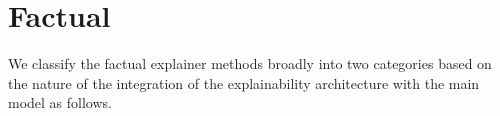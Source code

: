 \section{Factual}
\label{sec::Factual}
We classify the factual explainer methods broadly into two categories based on the nature of the integration of the explainability architecture with the main model as follows.



